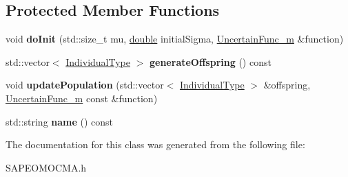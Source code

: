 \subsection*{Protected Member Functions}
\begin{DoxyCompactItemize}
\item 
void {\bfseries do\+Init} (std\+::size\+\_\+t mu, \hyperlink{classdouble}{double} initial\+Sigma, \hyperlink{classUncertainFunc__m}{Uncertain\+Func\+\_\+m} \&function)\hypertarget{classSAPEOmocma_a60c84b4dcfb5c87075e3bd9fc610e764}{}\label{classSAPEOmocma_a60c84b4dcfb5c87075e3bd9fc610e764}

\item 
std\+::vector$<$ \hyperlink{classUncertainCMAIndividual}{Individual\+Type} $>$ {\bfseries generate\+Offspring} () const \hypertarget{classSAPEOmocma_a3324e4610cdf79b693d581570ca58375}{}\label{classSAPEOmocma_a3324e4610cdf79b693d581570ca58375}

\item 
void {\bfseries update\+Population} (std\+::vector$<$ \hyperlink{classUncertainCMAIndividual}{Individual\+Type} $>$ \&offspring, \hyperlink{classUncertainFunc__m}{Uncertain\+Func\+\_\+m} const \&function)\hypertarget{classSAPEOmocma_a4f6acb94d9ef7616957c5c2060a788bc}{}\label{classSAPEOmocma_a4f6acb94d9ef7616957c5c2060a788bc}

\item 
std\+::string {\bfseries name} () const \hypertarget{classSAPEOmocma_ad1c0004a496e05d3c846c283322bf545}{}\label{classSAPEOmocma_ad1c0004a496e05d3c846c283322bf545}

\end{DoxyCompactItemize}


The documentation for this class was generated from the following file\+:\begin{DoxyCompactItemize}
\item 
S\+A\+P\+E\+O\+M\+O\+C\+M\+A.\+h\end{DoxyCompactItemize}
